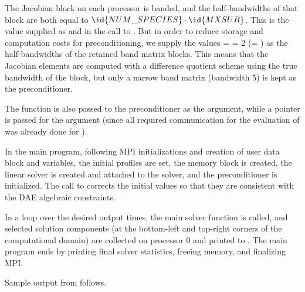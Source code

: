 The Jacobian block on each processor is banded, and the half-bandwidths of
that block are both equal to $\id{NUM\_SPECIES}\cdot\id{MXSUB}$.
This is the value supplied as  and  in the call to
.  But in order to reduce storage and computation costs for
preconditioning, we supply the values  =  = 2
(= ) as the half-bandwidths of the retained band matrix blocks.
This means that the Jacobian elements are computed with a difference quotient
scheme using the true bandwidth of the block, but only a narrow band
matrix (bandwidth 5) is kept as the preconditioner.

The function  is also passed to the {\idabbdpre} preconditioner
as the  argument, while a  pointer is passed for the 
argument (since all required communication for the evaluation of  was
already done for ).

In the  main program, following MPI initializations and
creation of user data block  and  variables,
the initial profiles are set, the {\ida} memory block is created, the
{\sunlinsolspgmr} linear solver is created and attached to the {\ida}
solver, and the {\idabbdpre} preconditioner is initialized.
The call to  corrects the initial values so that they are
consistent with the DAE algebraic constraints.  

In a loop over the desired output times, the main solver function 
is called, and selected solution components (at the bottom-left and top-right
corners of the computational domain) are collected on processor 0 and printed
to . The main program ends by printing final solver statistics,
freeing memory, and finalizing MPI.

Sample output from  follows.

